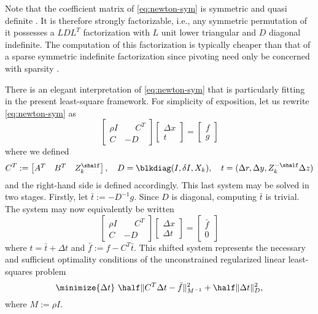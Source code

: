 \documentclass{amsart}
\begin{document}
Note that the coefficient matrix of \eqref{eq:newton-sym} is symmetric and
quasi definite \citep{vanderbei-1995}. It is therefore strongly factorizable,
i.e., any symmetric permutation of it possesses a $LDL^T$ factorization with
$L$ unit lower triangular and $D$ diagonal indefinite. The computation of this
factorization is typically cheaper than that of a sparse symmetric indefinite
factorization since pivoting need only be concerned with sparsity
\citep{gill-saunders-shinnerl-1996}.

There is an elegant interpretation of \eqref{eq:newton-sym} that is
particularly fitting in the present least-square framework. For simplicity of
exposition, let us rewrite \eqref{eq:newton-sym} as
\[
  \begin{bmatrix}
    \rho I & \phantom{-}C^T \\
    C & -D
  \end{bmatrix}
  \begin{bmatrix}
    \Delta x \\ t
  \end{bmatrix}
  =
  \begin{bmatrix}
    f \\ g
  \end{bmatrix}
\]
where we defined
\[
  C^T :=
  \begin{bmatrix}
    A^T & B^T & Z_k^{\shalf}
  \end{bmatrix},
  \quad
  D = \blkdiag(I, \delta I, X_k),
  \quad
  t = (\Delta r, \Delta y, Z_k^{-\shalf} \Delta z)
\]
and the right-hand side is defined accordingly. This last system may be solved
in two stages. Firstly, let $\bar{t} := -D^{-1} g$. Since $D$ is diagonal,
computing $\bar{t}$ is trivial. The system may now equivalently be written
\[
  \begin{bmatrix}
    \rho I & \phantom{-}C^T \\
    C & -D
  \end{bmatrix}
  \begin{bmatrix}
    \Delta x \\ \Delta t
  \end{bmatrix}
  =
  \begin{bmatrix}
    \bar{f} \, \\ 0
  \end{bmatrix}
\]
where $t = \bar{t} + \Delta t$ and $\bar{f} := f - C^T \bar{t}$. This shifted
system represents the necessary and sufficient optimality conditions of the
unconstrained regularized linear least-squares problem
\begin{equation}
  \label{eq:lsq-dir}
  \minimize{\Delta t} \
  \half \| C^T \Delta t - \bar{f} \|_{M^{-1}}^2 + \half \|\Delta t\|_D^2,
\end{equation}
where $M := \rho I$.
\end{document}
